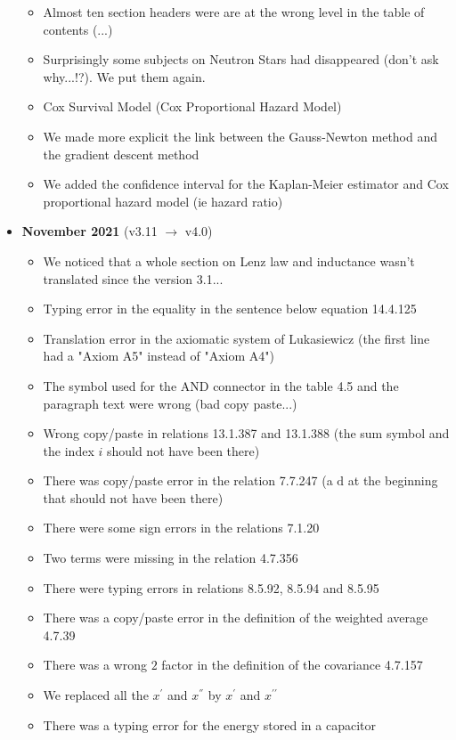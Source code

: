 \documentclass[12pt,a4paper,twoside,openright]{report}
\newcounter{def}
\theoremstyle{definition}
\theoremstyle{itexmp}
\numberwithin{equation}{section}
\begin{document}
\begin{itemize}
\begin{itemize}[noitemsep]
			\item Almost ten section headers were are at the wrong level in the table of contents (...)
			\item Surprisingly some subjects on Neutron Stars had disappeared (don't ask why...!?). We put them again.
			\item Cox Survival Model (Cox Proportional Hazard Model)
			\item We made more explicit the link between the Gauss-Newton method and the gradient descent method
			\item We added the confidence interval for the Kaplan-Meier estimator and Cox proportional hazard model (ie hazard ratio)
		\end{itemize}
	\pagebreak
	\item \textbf{November 2021} (v3.11 $\rightarrow$ v4.0)
		\begin{itemize}[noitemsep]
			\item We noticed that a whole section on Lenz law and inductance wasn't translated since the version 3.1...
			\item Typing error in the equality in the sentence below equation 14.4.125
			\item Translation error in the axiomatic system of Lukasiewicz (the first line had a "Axiom A5" instead of "Axiom A4")
			\item The symbol used for the AND connector in the table 4.5 and the paragraph text were wrong (bad copy paste...)
			\item Wrong copy/paste in relations 13.1.387 and 13.1.388 (the sum symbol and the index $i$ should not have been there)
			\item There was copy/paste error in the relation 7.7.247 (a $\mathrm{d}$ at the beginning that should not have been there)
			\item There were some sign errors in the relations 7.1.20
			\item Two terms were missing in the relation 4.7.356
			\item There were typing errors in relations 8.5.92, 8.5.94 and 8.5.95
			\item There was a copy/paste error in the definition of the weighted average 4.7.39
			\item There was a wrong $2$ factor in the definition of the covariance 4.7.157
			\item We replaced all the $x^{'}$ and $x^{''}$ by $x^\prime$ and $x^{\prime\prime}$
			\item There was a typing error for the energy stored in a capacitor

\end{itemize}
\end{itemize}
\end{document}
